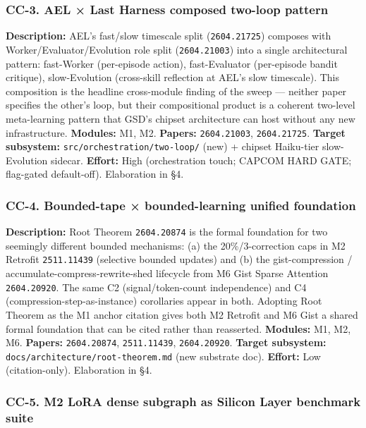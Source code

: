 \documentclass[11pt,letterpaper]{article}
\newcommand{\arxivid}[1]{\texttt{\textcolor{accent}{#1}}}
\begin{document}
\subsubsection{CC-3. AEL × Last Harness composed two-loop
pattern}

\textbf{Description:} AEL's fast/slow timescale split
(\arxivid{2604.21725}) composes with Worker/Evaluator/Evolution role
split (\arxivid{2604.21003}) into a single architectural pattern:
fast-Worker (per-episode action), fast-Evaluator (per-episode bandit
critique), slow-Evolution (cross-skill reflection at AEL's slow
timescale). This composition is the headline cross-module finding of the
sweep --- neither paper specifies the other's loop, but their
compositional product is a coherent two-level meta-learning pattern that
GSD's chipset architecture can host without any new infrastructure.
\textbf{Modules:} M1, M2. \textbf{Papers:} \arxivid{2604.21003}, \arxivid{2604.21725}.
\textbf{Target subsystem:} \texttt{src/orchestration/two-loop/} (new) +
chipset Haiku-tier slow-Evolution sidecar. \textbf{Effort:} High
(orchestration touch; CAPCOM HARD GATE; flag-gated default-off).
Elaboration in §4.

\subsubsection{CC-4. Bounded-tape × bounded-learning unified
foundation}

\textbf{Description:} Root Theorem \arxivid{2604.20874} is the formal
foundation for two seemingly different bounded mechanisms: (a) the
20\%/3-correction caps in M2 Retrofit \arxivid{2511.11439} (selective
bounded updates) and (b) the gist-compression /
accumulate-compress-rewrite-shed lifecycle from M6 Gist Sparse Attention
\arxivid{2604.20920}. The same C2 (signal/token-count independence) and
C4 (compression-step-as-instance) corollaries appear in both. Adopting
Root Theorem as the M1 anchor citation gives both M2 Retrofit and M6
Gist a shared formal foundation that can be cited rather than
reasserted. \textbf{Modules:} M1, M2, M6. \textbf{Papers:} \arxivid{2604.20874},
\arxivid{2511.11439}, \arxivid{2604.20920}. \textbf{Target subsystem:}
\texttt{docs/architecture/root-theorem.md} (new substrate doc).
\textbf{Effort:} Low (citation-only). Elaboration in §4.

\subsubsection{CC-5. M2 LoRA dense subgraph as Silicon Layer benchmark
suite}
\end{document}
